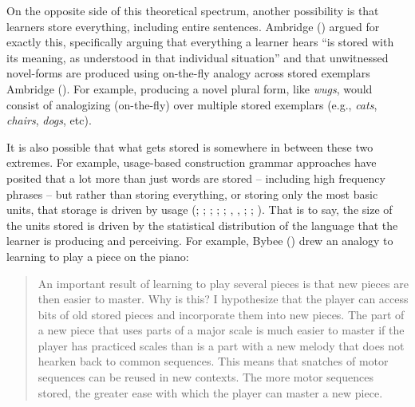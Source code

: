 \documentclass[
  12pt,
  letterpaper,
]{scrreprt}
\begin{document}
On the opposite side of this theoretical spectrum, another possibility
is that learners store everything, including entire sentences. Ambridge
() argued for
exactly this, specifically arguing that everything a learner hears ``is
stored with its meaning, as understood in that individual situation''
and that unwitnessed novel-forms are produced using on-the-fly analogy
across stored exemplars Ambridge
(). For
example, producing a novel plural form, like \emph{wugs}, would consist
of analogizing (on-the-fly) over multiple stored exemplars (e.g.,
\emph{cats}, \emph{chairs}, \emph{dogs}, etc).

It is also possible that what gets stored is somewhere in between these
two extremes. For example, usage-based construction grammar approaches
have posited that a lot more than just words are stored -- including
high frequency phrases -- but rather than storing everything, or storing
only the most basic units, that storage is driven by usage
(;
; ;
;
;
,
,
;
;
). That is to say, the size of the units stored is driven by the
statistical distribution of the language that the learner is producing
and perceiving. For example, Bybee () drew
an analogy to learning to play a piece on the piano:

\begin{quote}
An important result of learning to play several pieces is that new
pieces are then easier to master. Why is this? I hypothesize that the
player can access bits of old stored pieces and incorporate them into
new pieces. The part of a new piece that uses parts of a major scale is
much easier to master if the player has practiced scales than is a part
with a new melody that does not hearken back to common sequences. This
means that snatches of motor sequences can be reused in new contexts.
The more motor sequences stored, the greater ease with which the player
can master a new piece.
\end{quote}
\end{document}
